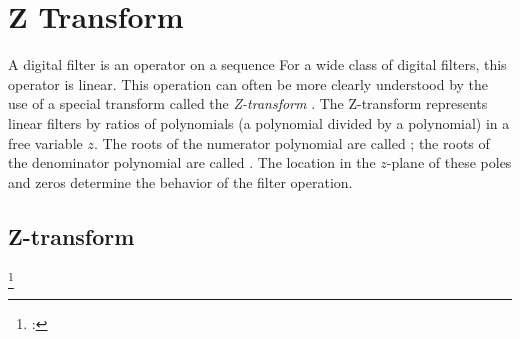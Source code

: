 \chapter{Z Transform}
\label{app:dsp}
\label{app:ztrans}
A digital filter is an operator on a sequence
For a wide class of digital filters, this operator is linear.
This operation can often be more clearly
understood by the use of a special transform called the {\em Z-transform} .
The Z-transform represents linear filters by ratios of polynomials
(a polynomial divided by a polynomial) in a free variable $z$.
The roots of the numerator polynomial are called ;
the roots of the denominator polynomial are called  .
The location in the $z$-plane of these poles and zeros
determine the behavior of the filter operation.

\section{Z-transform}
\begin{definition}
\footnote{
  : 
  }
\label{def:opZ}
\end{definition}


